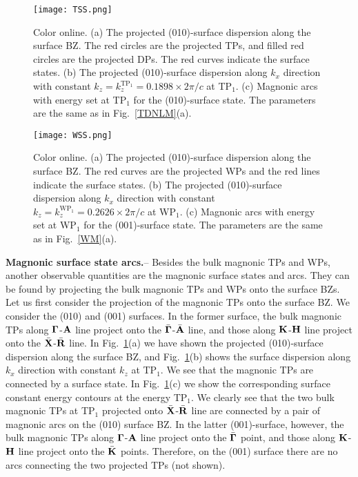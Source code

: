 \documentclass[doublecol]{epl2}
\begin{document}
 \begin{figure}
\centering
\texttt{[image: TSS.png]}
\caption{Color online.  (a) The projected (010)-surface dispersion along the surface BZ. The red circles are the projected TPs, and filled red circles are the projected DPs. The  red curves indicate the surface states.    (b) The projected (010)-surface dispersion along $k_x$ direction with constant $k_z=k_z^{\text{TP}_1}=0.1898\times 2\pi/c$ at TP$_1$. (c) Magnonic arcs with energy set at TP$_1$  for the (010)-surface state.   The parameters are the same as  in Fig.~\ref{TDNLM}(a).}
\label{TSS}
\end{figure}

\begin{figure}
\centering
\texttt{[image: WSS.png]}
\caption{Color online.  (a) The projected (010)-surface dispersion along the surface BZ. The red curves are the projected WPs and the red lines indicate the surface states.    (b) The projected (010)-surface dispersion along $k_x$ direction with constant $k_z=k_z^{\text{WP}_1}=0.2626\times 2\pi/c$ at WP$_1$. (c) Magnonic arcs with energy set at WP$_1$  for the (001)-surface state.   The parameters are the same as  in Fig.~\ref{WM}(a).}
\label{WSS}
\end{figure}

\textbf{Magnonic surface state arcs.}-- Besides the bulk magnonic TPs and WPs, another observable quantities are the  magnonic surface states and arcs. They can be found by projecting the bulk magnonic TPs and WPs onto the surface BZs. Let us first consider the projection of the magnonic TPs onto the surface BZ. We  consider the (010) and (001) surfaces. In the former surface, the bulk magnonic TPs along ${\bf \Gamma}$-${\bf A}$ line project onto the $\bar{\bf \Gamma}$-$\bar{\bf A}$ line, and those along ${\bf K}$-${\bf H}$ line project onto the $\bar{\bf X}$-$\bar{\bf R}$  line.   In Fig.~\ref{TSS}(a) we have shown the projected (010)-surface dispersion along the surface BZ,  and Fig.~\ref{TSS}(b) shows the surface dispersion along $k_x$ direction with constant $k_z$ at TP$_1$. We see that the magnonic TPs are connected by a surface state. In Fig.~\ref{TSS}(c) we show the corresponding surface constant energy contours at the energy TP$_1$.  We clearly see that the two bulk magnonic TPs  at TP$_1$ projected onto  $\bar{\bf X}$-$\bar{\bf R}$  line  are connected by a pair of magnonic  arcs on the  (010) surface BZ. In the latter (001)-surface, however, the bulk magnonic TPs along ${\bf \Gamma}$-${\bf A}$ line project onto the $\bar{\bf \Gamma}$ point, and those along ${\bf K}$-${\bf H}$ line project onto the $\bar{\bf K}$ points. Therefore,  on the (001) surface there are no arcs connecting the two projected TPs (not shown).
\end{document}
